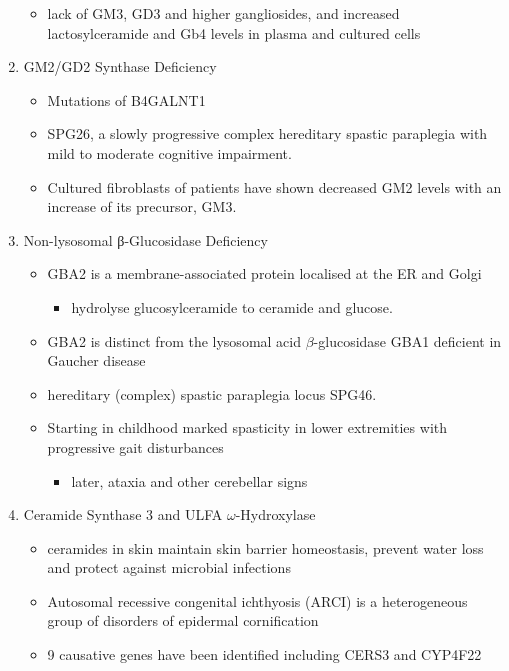 \documentclass{scrartcl}
\begin{document}
\begin{enumerate}
\begin{itemize}
\item lack of GM3, GD3 and higher gangliosides, and increased
lactosylceramide and Gb4 levels in plasma and cultured cells
\end{itemize}

\item GM2/GD2 Synthase Deficiency
\label{sec:org8d9a441}

\begin{itemize}
\item Mutations of B4GALNT1
\item SPG26, a slowly progressive complex hereditary spastic paraplegia
with mild to moderate cognitive impairment.

\item Cultured fibroblasts of patients have shown decreased GM2 levels
with an increase of its precursor, GM3.
\end{itemize}

\item Non-lysosomal β-Glucosidase Deficiency
\label{sec:org9f7ba44}

\begin{itemize}
\item GBA2 is a membrane-associated protein localised at the ER and Golgi
\begin{itemize}
\item hydrolyse glucosylceramide to ceramide and glucose.
\end{itemize}
\item GBA2 is distinct from the lysosomal acid \(\beta\)-glucosidase GBA1 deficient in Gaucher disease
\item hereditary (complex) spastic paraplegia locus SPG46.
\item Starting in childhood marked spasticity in lower extremities with
progressive gait disturbances
\begin{itemize}
\item later, ataxia and other cerebellar signs
\end{itemize}
\end{itemize}

\item Ceramide Synthase 3 and ULFA \(\omega\)-Hydroxylase
\label{sec:orgb265656}

\begin{itemize}
\item ceramides in skin maintain skin barrier homeostasis, prevent water
loss and protect against microbial infections
\item Autosomal recessive congenital ichthyosis (ARCI) is a heterogeneous
group of disorders of epidermal cornification
\item 9 causative genes have been identified including CERS3 and CYP4F22


\end{itemize}
\end{enumerate}
\end{document}
